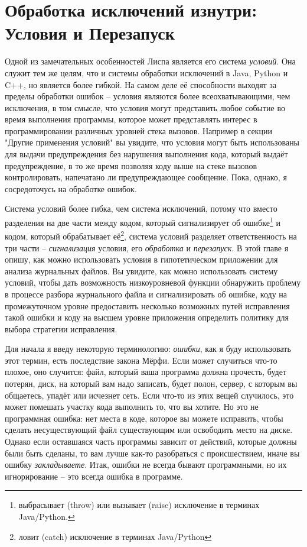 \chapter{Обработка исключений изнутри: Условия и Перезапуск}
\label{ch:19}

Одной из замечательных особенностей Лиспа является его система \textit{условий}. Она
служит тем же целям, что и системы обработки исключений в Java, Python и C++, но является
более гибкой. На самом деле её способности выходят за пределы обработки ошибок -- условия
являются более всеохватывающими, чем исключения, в том смысле, что условия могут
представить любое событие во время выполнения программы, которое может представлять
интерес в программировании различных уровней стека вызовов. Например в секции "Другие
применения условий" вы увидите, что условия могут быть использованы для выдачи
предупреждения без нарушения выполнения кода, который выдаёт предупреждение, в то же время
позволяя коду выше на стеке вызовов контролировать, напечатано ли предупреждающее
сообщение. Пока, однако, я сосредоточусь на обработке ошибок.

Система условий более гибка, чем система исключений, потому что вместо разделения на две
части между кодом, который сигнализирует об ошибке\footnote{выбрасывает (throw) или
  вызывает (raise) исключение в терминах Java/Python.} и кодом, который обрабатывает
её\footnote{ловит (catch) исключение в терминах Java/Python}, система условий разделяет
ответственность на три части -- \textit{сигнализация} условия, его \textit{обработка} и
\textit{перезапуск}. В этой главе я опишу, как можно использовать условия в гипотетическом
приложении для анализа журнальных файлов. Вы увидите, как можно использовать систему
условий, чтобы дать возможность низкоуровневой функции обнаружить проблему в процессе
разбора журнального файла и сигнализировать об ошибке, коду на промежуточном уровне
предоставить несколько возможных путей исправления такой ошибки и коду на высшем уровне
приложения определить политику для выбора стратегии исправления.

Для начала я введу некоторую терминологию: \textit{ошибки}, как я буду использовать этот
термин, есть последствие закона Мёрфи. Если может случиться что-то плохое, оно случится:
файл, который ваша программа должна прочесть, будет потерян, диск, на который вам надо
записать, будет полон, сервер, с которым вы общаетесь, упадёт или исчезнет сеть. Если
что-то из этих вещей случилось, это может помешать участку кода выполнить то, что вы
хотите. Но это не программная ошибка: нет места в коде, которое вы можете исправить, чтобы
сделать несуществующий файл существующим или освободить место на диске. Однако если
оставшаяся часть программы зависит от действий, которые должны были быть сделаны, то вам
лучше как-то разобраться с происшествием, иначе вы ошибку \textit{закладываете}. Итак,
ошибки не всегда бывают программными, но их игнорирование -- это всегда ошибка в
программе.

